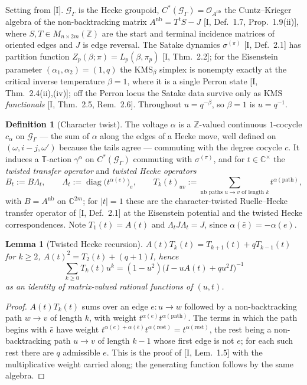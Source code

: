 \documentclass[11pt]{amsart}
\numberwithin{equation}{section}
\newtheorem{lemma}[theorem]{Lemma}
\theoremstyle{definition}
\newtheorem{definition}[theorem]{Definition}
\theoremstyle{remark}
\newcommand{\Z}{\mathbb{Z}}
\newcommand{\C}{\mathbb{C}}
\newcommand{\La}{\Lambda}
\newcommand{\cO}{\mathcal{O}}
\newcommand{\cG}{\mathcal{G}}
\newcommand{\KMS}{\mathrm{KMS}}
\newcommand{\Anb}{A^{\mathrm{nb}}}
\begin{document}
Setting from [I]. $\cG_\Gamma$ is the Hecke groupoid, $C^*(\cG_\Gamma)=\cO_{\Anb}$ the
Cuntz--Krieger algebra of the non-backtracking matrix
$\Anb=T^{t}S-J$ [I, Def.~1.7, Prop.~1.9(ii)], where $S,T\in M_{n\times2m}(\Z)$ are the
start and terminal incidence matrices of oriented edges and $J$ is edge reversal. The
Satake dynamics $\sigma^{(\pi)}$ [I, Def.~2.1] has partition function
$Z_p(\beta;\pi)=L_p(\beta,\pi_p)$ [I, Thm.~2.2]; for the Eisenstein parameter
$(\alpha_1,\alpha_2)=(1,q)$ the $\KMS_\beta$ simplex is nonempty exactly at the critical
inverse temperature $\beta=1$, where it is a single Perron state [I, Thm.~2.4(ii),(iv)];
off the Perron locus the Satake data survive only as $\KMS$ \emph{functionals}
[I, Thm.~2.5, Rem.~2.6]. Throughout $u=q^{-\beta}$, so $\beta=1$ is $u=q^{-1}$.

\begin{definition}[Character twist]\label{def:twist}
The voltage $\alpha$ is a $\Z$-valued continuous $1$-cocycle $c_\alpha$ on
$\cG_\Gamma$ --- the sum of $\alpha$ along the edges of a Hecke move, well defined on
$(\omega,i-j,\omega')$ because the tails agree --- commuting with the degree cocycle
$c$. It induces a $\mathbb T$-action $\gamma^{\alpha}$ on $C^*(\cG_\Gamma)$ commuting
with $\sigma^{(\pi)}$, and for $t\in\C^{\times}$ the \emph{twisted transfer operator} and
\emph{twisted Hecke operators}
\[
B_t:=B\La_t,\qquad \La_t:=\operatorname{diag}\bigl(t^{\alpha(e)}\bigr)_{e},\qquad
T_k(t)_{uv}:=\sum_{\text{nb paths }u\to v\text{ of length }k}t^{\alpha(\text{path})},
\]
with $B=\Anb$ on $\C^{2m}$; for $|t|=1$ these are the character-twisted Ruelle--Hecke
transfer operator of [I, Def.~2.1] at the Eisenstein potential and the twisted Hecke
correspondences. Note $T_1(t)=A(t)$ and $\La_tJ\La_t=J$, since $\alpha(\bar e)=-\alpha(e)$.
\end{definition}

\begin{lemma}[Twisted Hecke recursion]\label{lem:rec}
$A(t)T_k(t)=T_{k+1}(t)+qT_{k-1}(t)$ for $k\ge2$, $A(t)^{2}=T_2(t)+(q{+}1)I$, hence
\[
\sum_{k\ge0}T_k(t)u^{k}=(1-u^{2})\bigl(I-uA(t)+qu^{2}I\bigr)^{-1}
\]
as an identity of matrix-valued rational functions of $(u,t)$.
\end{lemma}

\begin{proof}
$A(t)T_k(t)$ sums over an edge $e\colon u\to w$ followed by a non-backtracking path
$w\to v$ of length $k$, with weight $t^{\alpha(e)}t^{\alpha(\text{path})}$. The terms in
which the path begins with $\bar e$ have weight $t^{\alpha(e)+\alpha(\bar e)}
t^{\alpha(\text{rest})}=t^{\alpha(\text{rest})}$, the rest being a non-backtracking path
$u\to v$ of length $k-1$ whose first edge is not $e$; for each such rest there are $q$
admissible $e$. This is the proof of [I, Lem.~1.5] with the multiplicative weight
carried along; the generating function follows by the same algebra.
\end{proof}
\end{document}
